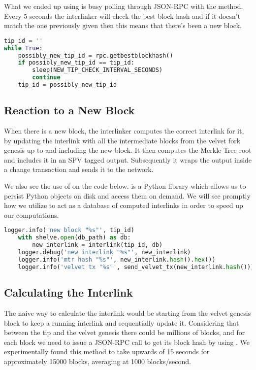 What we ended up using is busy polling through JSON-RPC with the  method. Every 5 seconds the interlinker will check the best block hash and if it doesn't match the one previously given then this means that there's been a new block.

\begin{lstlisting}[language=Python]
tip_id = ''
while True:
    possibly_new_tip_id = rpc.getbestblockhash()
    if possibly_new_tip_id == tip_id:
        sleep(NEW_TIP_CHECK_INTERVAL_SECONDS)
        continue
    tip_id = possibly_new_tip_id
\end{lstlisting}

\subsection{Reaction to a New Block}

When there is a new block, the interlinker computes the correct interlink for it, by updating the interlink with all the intermediate blocks from the velvet fork genesis up to and including the new block. It then computes the Merkle Tree root and includes it in an SPV tagged output. Subsequently it wraps the output inside a change transaction and sends it to the network.

We also see the use of  on the code below.  is a Python library which allows us to persist Python objects on disk and access them on demand. We will see promptly how we utilize  to act as a database of computed interlinks in order to speed up our computations.

\begin{lstlisting}[language=Python]
    logger.info('new block "%s"', tip_id)
    with shelve.open(db_path) as db:
        new_interlink = interlink(tip_id, db)
    logger.debug('new interlink "%s"', new_interlink)
    logger.info('mtr hash "%s"', new_interlink.hash().hex())
    logger.info('velvet tx "%s"', send_velvet_tx(new_interlink.hash()))
\end{lstlisting}

\subsection{Calculating the Interlink}

The naive way to calculate the interlink would be starting from the velvet genesis block to keep a running interlink and sequentially update it. Considering that between the tip and the velvet genesis there could be millions of blocks, and for each block we need to issue a JSON-RPC call to get its block hash by using . We experimentally found this method to take upwards of 15 seconds for approximately 15000 blocks, averaging at 1000 blocks/second.

